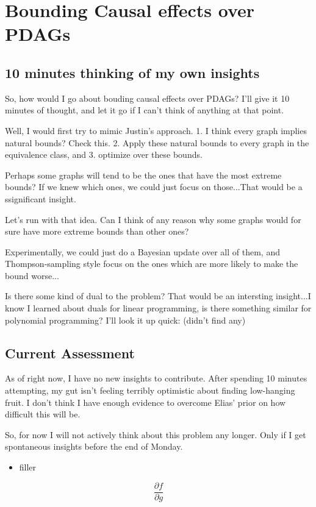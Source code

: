 \documentclass[letterpaper,10pt]{article}
\begin{document}
\newpage
\section{Bounding Causal effects over PDAGs}
\subsection{10 minutes thinking of my own insights}
So, how would I go about bouding causal effects over PDAGs? I'll give it 10 minutes of thought, and let it go if I can't think of anything at that point.

Well, I would first try to mimic Justin's approach. 1. I think every graph implies natural bounds? Check this. 2. Apply these natural bounds to every graph in the equivalence class, and 3. optimize over these bounds. 

Perhaps some graphs will tend to be the ones that have the most extreme bounds? If we knew which ones, we could just focus on those...That would be a ssignificant insight.

Let's run with that idea. Can I think of any reason why some graphs would for sure have more extreme bounds than other ones?

Experimentally, we could just do a Bayesian update over all of them, and Thompson-sampling style focus on the ones which are more likely to make the bound worse...

Is there some kind of dual to the problem? That would be an intersting insight...I know I learned about duals for linear programming, is there something similar for polynomial programming? I'll look it up quick: (didn't find any)

\subsection{Current Assessment}
As of right now, I have no new insights to contribute. After spending 10 minutes attempting, my gut isn't feeling terribly optimistic about finding low-hanging fruit. I don't think I have enough evidence to overcome Elias' prior on how difficult this will be.

So, for now I will not actively think about this problem any longer. Only if I get spontaneous insights before the end of Monday.



\newpage

\begin{itemize}
  \item filler
\end{itemize}

\[
\frac{\partial f}{\partial g}
\]
\end{document}
